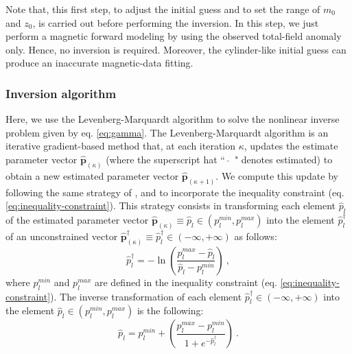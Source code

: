 Note that, this first step, to adjust the initial guess and to set the range of $m_{0}$ and $z_{0}$, is carried out before performing the inversion. 
In this step, we just perform a magnetic forward modeling by using the observed total-field anomaly only. Hence, no inversion is required. 
Moreover, the cylinder-like initial guess can produce an inaccurate magnetic-data fitting.


\subsubsection{Inversion algorithm}

Here, we use the Levenberg-Marquardt algorithm \cite[e.g., ][ p. 240]{aster-etal2019} to solve the nonlinear inverse problem given by eq. \ref{eq:gamma}.
The Levenberg-Marquardt algorithm is an iterative gradient-based method that, at each iteration $\kappa$, updates the estimate parameter vector $\hat{\mathbf{p}}_{(\kappa)}$ (where the superscript hat ``~$\hat{}$~" denotes estimated) to obtain a new estimated parameter vector $\hat{\mathbf{p}}_{(\kappa + 1)}$.
We compute this update by following the same strategy of \cite{barbosa-1999b}, \cite{oliveirajr-etal2011} and \cite{oliveirajr-barbosa2013} to incorporate the inequality constraint (eq. \ref{eq:inequality-constraint}). 
This strategy consists in transforming each element $\hat{p}_{l}$ of the estimated parameter vector $\hat{\mathbf{p}}_{(\kappa)} \equiv \hat{p}_{l} \in (p_{l}^{min}, p_{l}^{max}) $ 
into the element $\hat{p}^{\dagger}_{l}$ of an unconstrained vector 
$\hat{\mathbf{p}}^{\dagger}_{(\kappa)} \equiv \hat{p}^{\dagger}_{l} \in (- \infty, + \infty)$ 
as follows:
\begin{equation}\label{eq:inequality-function}
\hat{p}^{\dagger}_{l} = -\ln\left(\frac{p_{l}^{max} - \hat{p}_{l}}{\hat{p}_{l} - p_{l}^{min}}\right) \: ,
\end{equation}
where $p_{l}^{min}$ and $p_{l}^{max}$ are defined in the inequality constraint 
(eq. \ref{eq:inequality-constraint}).
The inverse transformation of each element $\hat{p}^{\dagger}_{l} \in (- \infty, + \infty)$ into the element $\hat{p}_{l} \in (p_{l}^{min}, p_{l}^{max})$ is the following:
\begin{equation}\label{eq:inv-inequality-function}
\hat{p}_{l} = p_{l}^{min} + \left(\frac{p_{l}^{max} - p_{l}^{min}}{ 1 + e^{-\hat{p}^{\dagger}_{l}} }\right) \: .
\end{equation}

